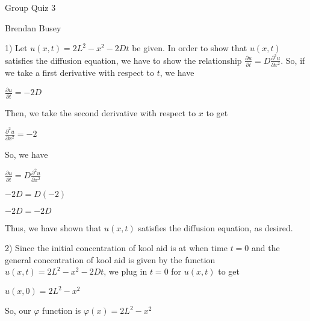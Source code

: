 \documentclass[executivepaper]{article}
\begin{document}
\vspace*{-40mm}

\begin{center}

Group Quiz 3

\end{center}

\begin{flushright}

Brendan Busey

\end{flushright}

\begin{flushleft}

1) Let $u(x,t)=2L^2-x^2-2Dt$ be given. In order to show that $u(x,t)$ satisfies the diffusion equation, we have to show the relationship $\frac{\partial u}{\partial t}=D\frac{\partial^2 u}{\partial x^2}$. So, if we take a first derivative with respect to $t$, we have

\begin{center}

$\frac{\partial u}{\partial t}=-2D$

\end{center}

Then, we take the second derivative with respect to $x$ to get

\begin{center}

$\frac{\partial^2 u}{\partial x^2}=-2$

\end{center}

So, we have

\begin{center}

$\frac{\partial u}{\partial t}=D\frac{\partial^2 u}{\partial x^2}$

\vspace{1mm}

$-2D=D(-2)$

\vspace{1mm}

$-2D=-2D$

\end{center}

Thus, we have shown that $u(x,t)$ satisfies the diffusion equation, as desired.

\end{flushleft}

\begin{flushleft}

2) Since the initial concentration of kool aid is at when time $t=0$ and the general concentration of kool aid is given by the function $u(x,t)=2L^2-x^2-2Dt$, we plug in $t=0$ for $u(x,t)$ to get

\begin{center}

$u(x,0)=2L^2-x^2$

\end{center}

So, our $\varphi$ function is $\varphi(x)=2L^2-x^2$

\end{flushleft}
\end{document}
